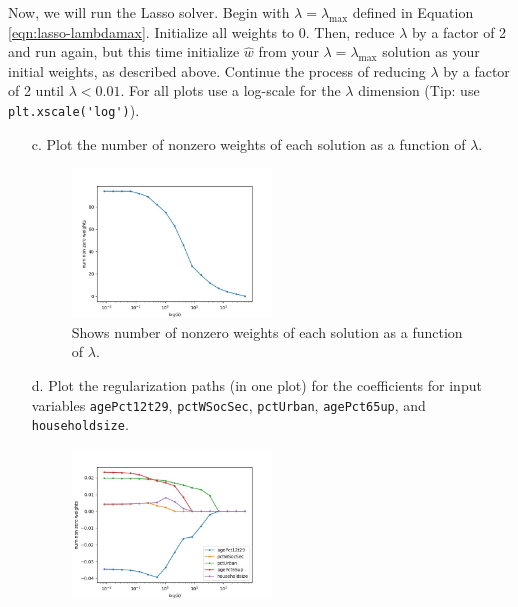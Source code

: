 \documentclass[shortlabels]{article}
\begin{document}
\begin{aprob}
    \newpage

    Now, we will run the Lasso solver. Begin with $\lambda = \lambda_{\max}$ defined in Equation \eqref{eqn:lasso-lambdamax}. Initialize all weights to $0$. Then, reduce $\lambda$ by a factor of 2 and run again, but this time initialize $\hat{{w}}$ from your $\lambda = \lambda_{\max}$ solution as your initial weights, as described above. Continue the process of reducing $\lambda$ by a factor of 2 until $\lambda < 0.01$.
    For all plots use a log-scale for the $\lambda$ dimension (Tip: use
    \verb|plt.xscale('log')|).
    \\


    \begin{enumerate}
        \item[c.]  Plot the number of nonzero weights of each solution as a function of $\lambda$.
        \begin{figure}[h]
            \centering
            \includegraphics[width=0.5\textwidth]{../hw2-code/lambda_vs_num-nonzero.jpg}
            \caption{Shows number of nonzero weights of each solution as a function of $\lambda$.}
            \label{fig:num_nonzero}
        \end{figure}
        \newpage
        \item[d.]  Plot the regularization paths (in one plot) for the coefficients for input variables \texttt{agePct12t29}, \texttt{pctWSocSec}, \texttt{pctUrban}, \texttt{agePct65up}, and \texttt{householdsize}.
        \begin{figure}[h]
            \centering
            \includegraphics[width=0.5\textwidth]{../hw2-code/lambda_vs_regularizationpaths.jpg}

\end{figure}
\end{enumerate}
\end{aprob}
\end{document}
